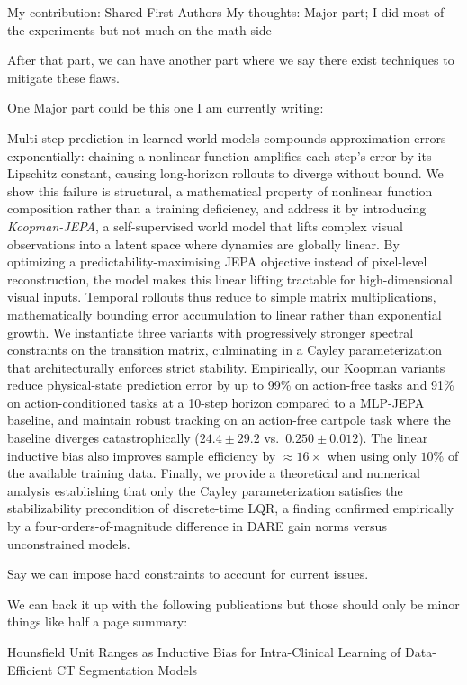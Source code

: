 My contribution: Shared First Authors
My thoughts: Major part; I did most of the experiments but not much on the math side



After that part, we can have another part where we say there exist techniques to mitigate these flaws.

One Major part could be this one I am currently writing:

Multi-step prediction in learned world models compounds approximation errors exponentially: chaining a nonlinear function amplifies each step's error by its Lipschitz constant, causing long-horizon rollouts to diverge without bound. We show this failure is structural, a mathematical property of nonlinear function composition rather than a training deficiency, and address it by introducing \emph{Koopman-JEPA}, a self-supervised world model that lifts complex visual observations into a latent space where dynamics are globally linear. By optimizing a predictability-maximising JEPA objective instead of pixel-level reconstruction, the model makes this linear lifting tractable for high-dimensional visual inputs. Temporal rollouts thus reduce to simple matrix multiplications, mathematically bounding error accumulation to linear rather than exponential growth. We instantiate three variants with progressively stronger spectral constraints on the transition matrix, culminating in a Cayley parameterization that architecturally enforces strict stability.
Empirically, our Koopman variants reduce physical-state prediction error by up to 99\% on action-free tasks and 91\% on action-conditioned tasks at a 10-step horizon compared to a MLP-JEPA baseline, and maintain robust tracking on an action-free cartpole task where the baseline diverges catastrophically ($24.4 \pm 29.2$ vs.\ $0.250 \pm 0.012$). The linear inductive bias also improves sample efficiency by $\approx 16\times$ when using only $10$\% of the available training data. Finally, we provide a theoretical and numerical analysis establishing that only the Cayley parameterization satisfies the stabilizability precondition of discrete-time LQR, a finding confirmed empirically by a four-orders-of-magnitude difference in DARE gain norms versus unconstrained models.

Say we can impose hard constraints to account for current issues.

We can back it up with the following publications but those should only be minor things like half a page summary:

Hounsfield Unit Ranges as Inductive Bias for Intra-Clinical Learning of Data-Efficient CT Segmentation Models


